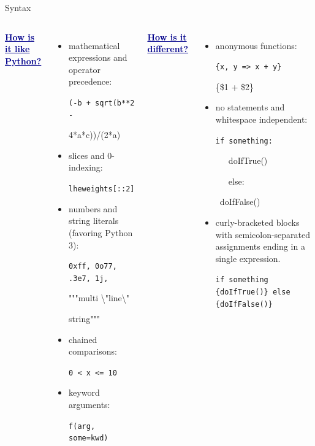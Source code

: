 \documentclass{beamer}
\begin{document}
\begin{frame}[fragile]{Syntax}
\vspace{0.3 cm}
\begin{columns}[t]
\textcolor{darkblue}{\underline{\bf How is it like Python?}}
\begin{itemize}
\item mathematical expressions and operator precedence:

{\small\tt (-b + sqrt(b**2 -

\hfill 4*a*c))/(2*a)}

\item slices and 0-indexing:

{\small\tt lheweights[::2]}

\item numbers and string literals (favoring Python 3):

{\small\tt 0xff, 0o77, .3e7, 1j,

"""multi \textbackslash"line\textbackslash"

string"""}

\item chained comparisons:

{\small\tt 0 < x <= 10}

\item keyword arguments:

{\small\tt f(arg, some=kwd)}

\end{itemize}

\textcolor{darkblue}{\underline{\bf How is it different?}}
\begin{itemize}
\item anonymous functions:

{\small\tt \{x, y => x + y\}

\{\$1 + \$2\}}

\item no statements and whitespace independent:

{\small\tt if something:

\ \ \ doIfTrue()

\ \ \ else:

\ doIfFalse()}

\item curly-bracketed blocks with semicolon-separated assignments ending in a single expression.

{\small\tt if something \{doIfTrue()\} else \{doIfFalse()\}}
\end{itemize}
\end{columns}
\end{frame}
\end{document}
